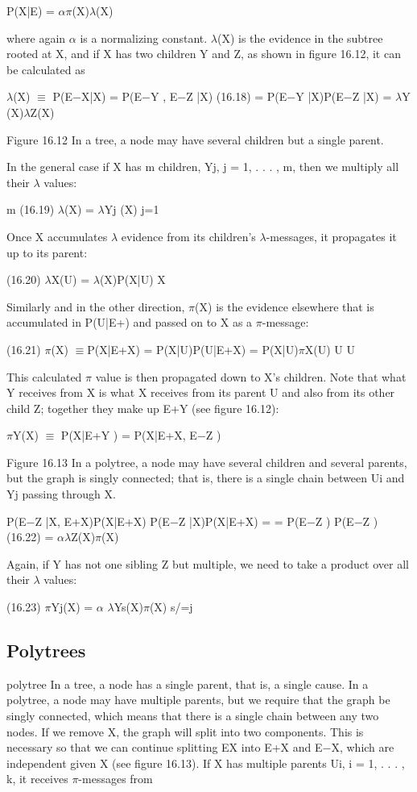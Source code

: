 P(X|E) = $\alpha$$\pi$(X)$\lambda$(X)

where again $\alpha$ is a normalizing constant. $\lambda$(X) is the evidence in the subtree rooted at X, and if X has two children Y and Z, as shown in figure 16.12, it can be calculated as

$\lambda$(X) $\equiv$ P(E$-$X|X) = P(E$-$Y , E$-$Z |X) (16.18) = P(E$-$Y |X)P(E$-$Z |X) = $\lambda$Y (X)$\lambda$Z(X)

Figure 16.12 In a tree, a node may have several children but a single parent.

In the general case if X has m children, Yj, j = 1, . . . , m, then we multiply all their $\lambda$ values:

m (16.19) $\lambda$(X) = $\lambda$Yj (X) j=1

Once X accumulates $\lambda$ evidence from its children’s $\lambda$-messages, it propagates it up to its parent:

(16.20) $\lambda$X(U) = $\lambda$(X)P(X|U) X

Similarly and in the other direction, $\pi$(X) is the evidence elsewhere that is accumulated in P(U|E+) and passed on to X as a $\pi$-message:

(16.21) $\pi$(X) $\equiv$P(X|E+X) = P(X|U)P(U|E+X) = P(X|U)$\pi$X(U) U U

This calculated $\pi$ value is then propagated down to X’s children. Note that what Y receives from X is what X receives from its parent U and also from its other child Z; together they make up E+Y (see figure 16.12):

$\pi$Y(X) $\equiv$ P(X|E+Y ) = P(X|E+X, E$-$Z )

Figure 16.13 In a polytree, a node may have several children and several parents, but the graph is singly connected; that is, there is a single chain between Ui and Yj passing through X.

P(E$-$Z |X, E+X)P(X|E+X) P(E$-$Z |X)P(X|E+X) = = P(E$-$Z ) P(E$-$Z ) (16.22) = $\alpha$$\lambda$Z(X)$\pi$(X)

Again, if Y has not one sibling Z but multiple, we need to take a product over all their $\lambda$ values:

(16.23) $\pi$Yj(X) = $\alpha$ $\lambda$Ys(X)$\pi$(X) s/=j

\subsection{Polytrees}

polytree In a tree, a node has a single parent, that is, a single cause. In a polytree, a node may have multiple parents, but we require that the graph be singly connected, which means that there is a single chain between any two nodes. If we remove X, the graph will split into two components. This is necessary so that we can continue splitting EX into E+X and E$-$X, which are independent given X (see figure 16.13). If X has multiple parents Ui, i = 1, . . . , k, it receives $\pi$-messages from

